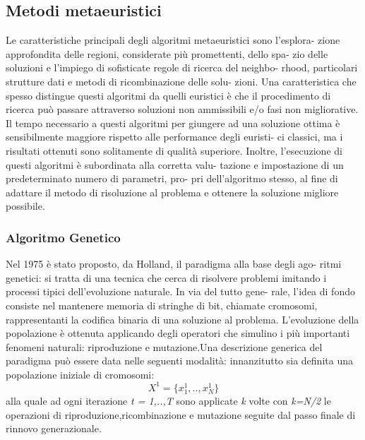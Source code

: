\documentclass[]{article}
\begin{document}
\subsection{Metodi metaeuristici}
Le caratteristiche principali degli algoritmi metaeuristici sono l’esplora-
zione approfondita delle regioni, considerate più promettenti, dello spa-
zio delle soluzioni e l’impiego di sofisticate regole di ricerca del neighbo-
rhood, particolari strutture dati e metodi di ricombinazione delle solu-
zioni. Una caratteristica che spesso distingue questi algoritmi da quelli
euristici è che il procedimento di ricerca può passare attraverso soluzioni
non ammissibili e/o fasi non migliorative.
Il tempo necessario a questi algoritmi per giungere ad una soluzione
ottima è sensibilmente maggiore rispetto alle performance degli euristi-
ci classici, ma i risultati ottenuti sono solitamente di qualità superiore.
Inoltre, l’esecuzione di questi algoritmi è subordinata alla corretta valu-
tazione e impostazione di un predeterminato numero di parametri, pro-
pri dell’algoritmo stesso, al fine di adattare il metodo di risoluzione al
problema e ottenere la soluzione migliore possibile.

\subsubsection{Algoritmo Genetico}
Nel 1975 è stato proposto, da Holland, il paradigma alla base degli ago-
ritmi genetici: si tratta di una tecnica che cerca di risolvere problemi
imitando i processi tipici dell’evoluzione naturale. In via del tutto gene-
rale, l’idea di fondo consiste nel mantenere memoria di stringhe di bit,
chiamate cromosomi, rappresentanti la codifica binaria di una soluzione
al problema. L’evoluzione della popolazione è ottenuta applicando degli
operatori che simulino i più importanti fenomeni naturali: riproduzione
e mutazione.Una descrizione generica del paradigma può essere data nelle seguenti
modalità: innanzitutto sia definita una popolazione iniziale di cromosomi:
\begin{equation}
 X^1 = \{ x_{1}^1,..,x_{N}^1\}
\end{equation}
alla quale  ad ogni iterazione \emph{t = 1,..,T} sono applicate \emph{k} volte con \emph{k=N/2} le operazioni di riproduzione,ricombinazione e mutazione seguite dal passo finale di rinnovo generazionale.
\end{document}
